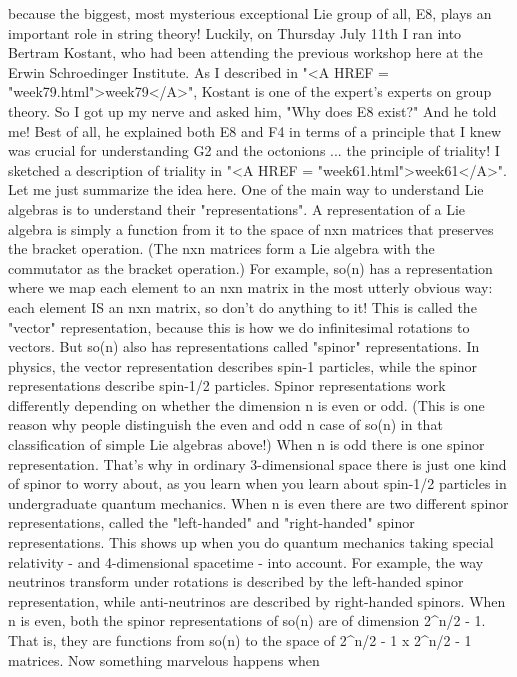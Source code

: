 because the biggest, most mysterious exceptional Lie group of
all, E8, plays an important role in string theory!
Luckily, on Thursday July 11th I ran into Bertram Kostant, who had
been attending the previous workshop here at the Erwin Schroedinger
Institute.  As I described in "<A HREF = "week79.html">week79</A>", Kostant is one of the expert's
experts on group theory.  So I got up my nerve and asked him, "Why
does E8 exist?"  And he told me!  Best of all, he explained both E8
and F4 in terms of a principle that I knew was crucial for
understanding G2 and the octonions ... the principle of triality!
I sketched a description of triality in "<A HREF = "week61.html">week61</A>".  
Let me just
summarize the idea here.  One of the main way to understand Lie
algebras is to understand their "representations".  A representation
of a Lie algebra is simply a function from it to the space of nxn
matrices that preserves the bracket operation.  (The nxn matrices form
a Lie algebra with the commutator as the bracket operation.)  For
example, so(n) has a representation where we map each element to an
nxn matrix in the most utterly obvious way: each element IS an nxn
matrix, so don't do anything to it!  This is called the "vector"
representation, because this is how we do infinitesimal rotations to
vectors.  But so(n) also has representations called "spinor"
representations.  In physics, the vector representation describes
spin-1 particles, while the spinor representations describe spin-1/2 
particles.
Spinor representations work differently depending on whether the
dimension n is even or odd.  (This is one reason why people distinguish
the even and odd n case of so(n) in that classification of simple
Lie algebras above!)  When n is odd there is one spinor representation.  
That's why in ordinary 3-dimensional space there is just one kind of 
spinor to worry about, as you learn when you learn about spin-1/2 particles
in undergraduate quantum mechanics.  When n is even there are two different 
spinor representations, called the "left-handed" and "right-handed" 
spinor representations.  This shows up when you do quantum mechanics taking
special relativity - and 4-dimensional spacetime - into account.  For
example, the way neutrinos transform under rotations is described by
the left-handed spinor representation, while anti-neutrinos are described
by right-handed spinors. 
When n is even, both the spinor representations of so(n) are of 
dimension 2^{n/2 - 1}.  That is, they are functions from so(n) to the space of 
2^{n/2 - 1} x 2^{n/2 - 1} matrices.  Now something marvelous happens when 
